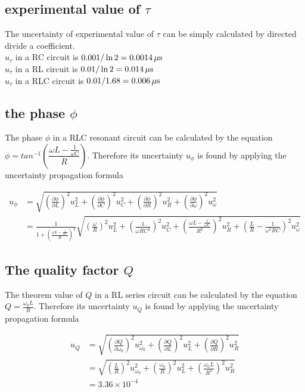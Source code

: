 \documentclass{article}
\begin{document}
\subsection{experimental value of $\tau$}

The uncertainty of experimental value of $\tau$ can be simply calculated by directed divide a coefficient.\\

$u_{\tau}$ in a RC circuit is $0.001/\ln2=0.0014\,\rm{\mu s}$\\

$u_{\tau}$ in a RL circuit is $0.01/\ln2=0.014\,\rm{\mu s}$\\

$u_{\tau}$ in a RLC circuit is $0.01/1.68=0.006\,\rm{\mu s}$\\

\subsection{the phase $\phi$}

The phase $\phi$ in a RLC resonant circuit can be calculated by the equation $\phi=tan^{-1}\left(\dfrac{\omega L-\frac{1}{\omega C}}{R}\right)$. Therefore its uncertainty $u_{\phi}$ is found by applying the uncertainty propagation formula

\begin{align*}
u_{\phi}&=\sqrt{\left(\frac{\partial \phi}{\partial L}\right)^2u_L^2+\left(\frac{\partial \phi}{\partial C}\right)^2u_C^2+\left(\frac{\partial \phi}{\partial R}\right)^2u_R^2+\left(\frac{\partial \phi}{\partial \omega}\right)^2u_\omega^2}\\
&=\frac{1}{1+\left(\frac{\omega L-\frac{1}{\omega C}}{R}\right)^2}\sqrt{\left(\frac{\omega}{R}\right)^2u_L^2+\left(\frac{1}{\omega RC^2}\right)^2u_C^2+\left(\frac{\omega L-\frac{1}{\omega C}}{R^2}\right)^2u_R^2+\left(\frac{L}{R}-\frac{1}{\omega^2RC}\right)^2u_\omega^2}
\end{align*}

\subsection{The quality factor $Q$}

The theorem value of $Q$ in a RL series circuit can be calculated by the equation $Q=\frac{\omega_0 L}{R}$. Therefore its uncertainty $u_Q$ is found by applying the uncertainty propagation formula

\begin{align*}
u_{Q}&=\sqrt{\left(\frac{\partial Q}{\partial \omega_0}\right)^2u_{\omega_0}^2+\left(\frac{\partial Q}{\partial L}\right)^2u_L^2+\left(\frac{\partial Q}{\partial R}\right)^2u_R^2}\\
&=\sqrt{\left(\frac{L}{R}\right)^2u_{\omega_0}^2+\left(\frac{\omega_0}{R}\right)^2u_L^2+\left(\frac{\omega_0L}{R^2}\right)^2u_R^2}\\
&=3.36\times10^{-4}
\end{align*}
\end{document}
